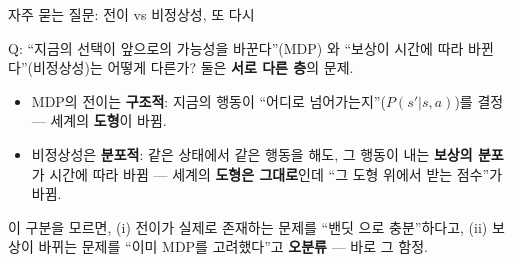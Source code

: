 \begin{frame}{자주 묻는 질문: 전이 vs 비정상성, 또 다시}
  \begin{block}{Q: ``지금의 선택이 앞으로의 가능성을 바꾼다''(MDP)
  와 ``보상이 시간에 따라 바뀐다''(비정상성)는 어떻게 다른가?}
    둘은 \textbf{서로 다른 층}의 문제.
    \begin{itemize}
      \item MDP의 전이는 \textbf{구조적}: 지금의 행동이
        ``어디로 넘어가는지''($P(s'|s,a)$)를 결정 --- 세계의
        \textbf{도형}이 바뀜.
      \item 비정상성은 \textbf{분포적}: 같은 상태에서 같은
        행동을 해도, 그 행동이 내는 \textbf{보상의 분포}가
        시간에 따라 바뀜 --- 세계의 \textbf{도형은 그대로}인데
        ``그 도형 위에서 받는 점수''가 바뀜.
    \end{itemize}
    이 구분을 모르면, (i) 전이가 실제로 존재하는 문제를 ``밴딧
   으로 충분''하다고, (ii) 보상이 바뀌는 문제를 ``이미 MDP를
    고려했다''고 \textbf{오분류} --- 바로 그 함정.
  \end{block}
\end{frame}
